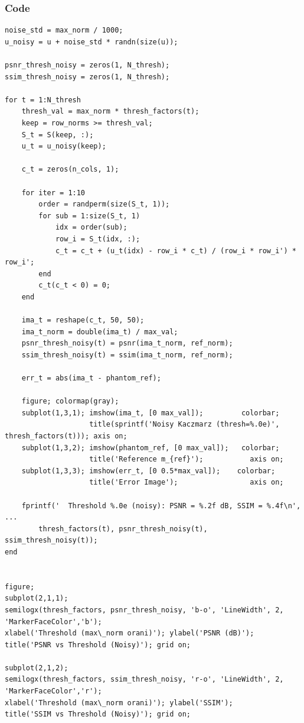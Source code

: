 \documentclass[12pt,a4paper]{article}
\begin{document}
\subsubsection*{Code}
\begin{lstlisting}
noise_std = max_norm / 1000;
u_noisy = u + noise_std * randn(size(u));

psnr_thresh_noisy = zeros(1, N_thresh);
ssim_thresh_noisy = zeros(1, N_thresh);

for t = 1:N_thresh
    thresh_val = max_norm * thresh_factors(t);
    keep = row_norms >= thresh_val;
    S_t = S(keep, :);
    u_t = u_noisy(keep);

    c_t = zeros(n_cols, 1);

    for iter = 1:10
        order = randperm(size(S_t, 1));
        for sub = 1:size(S_t, 1)
            idx = order(sub);
            row_i = S_t(idx, :);
            c_t = c_t + (u_t(idx) - row_i * c_t) / (row_i * row_i') * row_i';
        end
        c_t(c_t < 0) = 0;
    end

    ima_t = reshape(c_t, 50, 50);
    ima_t_norm = double(ima_t) / max_val;
    psnr_thresh_noisy(t) = psnr(ima_t_norm, ref_norm);
    ssim_thresh_noisy(t) = ssim(ima_t_norm, ref_norm);

    err_t = abs(ima_t - phantom_ref);

    figure; colormap(gray);
    subplot(1,3,1); imshow(ima_t, [0 max_val]);         colorbar;
                    title(sprintf('Noisy Kaczmarz (thresh=%.0e)', thresh_factors(t))); axis on;
    subplot(1,3,2); imshow(phantom_ref, [0 max_val]);   colorbar;
                    title('Reference m_{ref}');           axis on;
    subplot(1,3,3); imshow(err_t, [0 0.5*max_val]);    colorbar;
                    title('Error Image');                 axis on;

    fprintf('  Threshold %.0e (noisy): PSNR = %.2f dB, SSIM = %.4f\n', ...
        thresh_factors(t), psnr_thresh_noisy(t), ssim_thresh_noisy(t));
end


figure;
subplot(2,1,1);
semilogx(thresh_factors, psnr_thresh_noisy, 'b-o', 'LineWidth', 2, 'MarkerFaceColor','b');
xlabel('Threshold (max\_norm orani)'); ylabel('PSNR (dB)');
title('PSNR vs Threshold (Noisy)'); grid on;

subplot(2,1,2);
semilogx(thresh_factors, ssim_thresh_noisy, 'r-o', 'LineWidth', 2, 'MarkerFaceColor','r');
xlabel('Threshold (max\_norm orani)'); ylabel('SSIM');
title('SSIM vs Threshold (Noisy)'); grid on;
\end{lstlisting}
\end{document}
